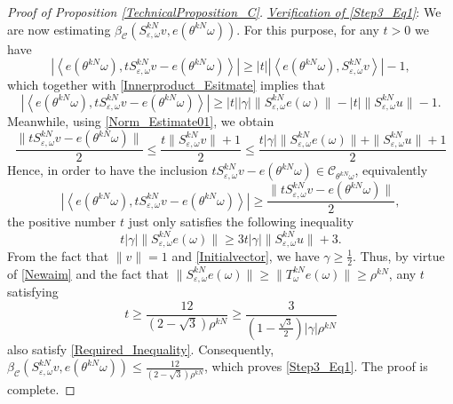 \documentclass[pdflatex,sn-mathphys-num]{sn-jnl}%
\theoremstyle{thmstyleone}%
\theoremstyle{thmstyletwo}%
\theoremstyle{thmstylethree}%
\newcommand{\cC}{\mathcal{C}}
\newcommand{\eps}{\varepsilon}
\numberwithin{equation}{section}
\begin{document}
\begin{proof}[Proof of Proposition \ref{TechnicalProposition_C}]
\noindent 
\underline{\emph{Verification of \eqref{Step3_Eq1}}}:  We are now estimating  $\beta_{\cC}(S_{\eps,\omega}^{kN}v, e(\theta^{kN}\omega))$. For this purpose, for any $t>0$ we have 
\[
\left|\left\langle
e(\theta^{kN}\omega), tS_{\eps,\omega}^{kN}v-e(\theta^{kN}\omega)
\right\rangle\right|    
\geq 
|t|\left|\left\langle
e(\theta^{kN}\omega), S_{\eps,\omega}^{kN}v
\right\rangle\right|-1,
\]
which together with \eqref{Innerproduct_Esitmate} implies that 
\begin{equation*}\label{Step3_Eq2}
 \left|\left\langle
e(\theta^{kN}\omega), tS_{\eps,\omega}^{kN}v-e(\theta^{kN}\omega)
\right\rangle\right|    
\geq 
|t||\gamma| \|S_{\eps,\omega}^{kN}e(\omega)\| -|t|\|S_{\eps,\omega}^{kN} u\|-1.
\end{equation*}
Meanwhile, using \eqref{Norm_Estimate01}, we obtain 
\[
\frac{\|tS_{\eps,\omega}^{kN}v-e(\theta^{kN}\omega)\|}{2}
\leq 
\frac{t\|S_{\eps,\omega}^{kN}v\|+1}{2} \leq 
\frac{t|\gamma|\|S_{\eps,\omega}^{kN}e(\omega)\|+\|S_{\eps,\omega}^{kN}u\|+1}{2}
\]
Hence, in order to have the inclusion  $tS_{\eps,\omega}^{kN}v-e(\theta^{kN}\omega)\in \cC_{\theta^{kN}\omega}$, equivalently \[\left|\left\langle
e(\theta^{kN}\omega), tS_{\eps,\omega}^{kN}v-e(\theta^{kN}\omega)
\right\rangle\right| \geq \frac{\|tS_{\eps,\omega}^{kN}v-e(\theta^{kN}\omega)\|}{2},
\]  
the positive number $t$ just only satisfies the following inequality 
\begin{equation}\label{Required_Inequality}
t|\gamma |\|S_{\eps,\omega}^{kN}e(\omega)\| \geq 3 t|\gamma|  \|S_{\eps,\omega}^{kN}u\|+3.
\end{equation}
From the fact that $\|v\|=1$ and \eqref{Initialvector}, we have $\gamma\geq \frac{1}{2}$. Thus, by virtue of \eqref{Newaim} and the fact that $\|S_{\eps,\omega}^{kN}e(\omega)\|\geq \|T_{\omega}^{kN}e(\omega)\|\geq \rho^{kN}$, any $t$ satisfying 
\[
t\geq \frac{12}{(2-\sqrt{3})\rho^{kN}}
\geq 
 \frac{3}{\left(1-\frac{\sqrt 3}{2}\right)|\gamma|\rho^{kN}}
\]
also satisfy \eqref{Required_Inequality}. Consequently, $\beta_{\cC}(S_{\eps,\omega}^{kN}v, e(\theta^{kN}\omega))\leq \frac{12}{(2-\sqrt{3})\rho^{kN}}$, which proves \eqref{Step3_Eq1}. The proof is complete.
\end{proof}
%

%
\end{document}
